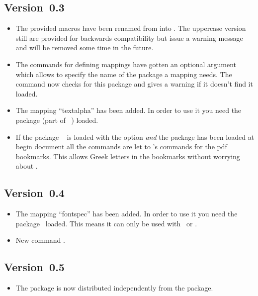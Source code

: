 \documentclass[load-preamble+,scrartcl={listof=totoc}]{cnltx-doc}
\begin{document}
\subsection{Version~0.3}
\begin{itemize}
  \item The provided macros have been renamed from 
    into .  The uppercase version still are provided
    for backwards compatibility but issue a warning message and will be
    removed some time in the future.
  \item The commands for defining mappings have gotten an optional argument
    which allows to specify the name of the package a mapping needs.  The
    command  now checks for this package and gives
    a warning if it doesn't find it loaded.
  \item The mapping ``textalpha'' has been added.  In order to use it you
    need the  package (part of
    ~\cite{bnd:greek-fontenc}) loaded.
  \item If the package ~\cite{pkg:hyperref} is loaded with the
     option \emph{and} the  package has been
    loaded at begin document all the  commands are let
    to 's  commands for the \acs{pdf}
    bookmarks.  This allows Greek letters in the bookmarks without worrying
    about .
\end{itemize}

\subsection{Version~0.4}
\begin{itemize}
  \item The mapping ``fontspec'' has been added.  In order to use it you
    need the  package~\cite{pkg:fontspec} loaded.  This means it
    can only be used with \LuaLaTeX\ or \XeLaTeX.
  \item New command .
\end{itemize}

\subsection{Version~0.5}
\begin{itemize}
  \item The package is now distributed independently from the 
    package.
\end{itemize}
\end{document}
